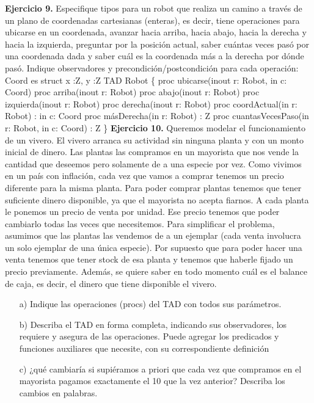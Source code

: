 \documentclass{article}
\begin{document}
\textbf{Ejercicio 9.} Especifique tipos para un robot que realiza un camino a trav\'es de un plano de coordenadas cartesianas (enteras),
es decir, tiene operaciones para ubicarse en un coordenada, avanzar hacia arriba, hacia abajo, hacia la derecha y hacia la
izquierda, preguntar por la posici\'on actual, saber cu\'antas veces pas\'o por una coordenada dada y saber cu\'al es la coordenada
m\'as a la derecha por d\'onde pas\'o. Indique observadores y precondici\'on/postcondici\'on para cada operaci\'on:
Coord es struct {x :Z, y :Z}
TAD Robot \{
proc ubicarse(inout r: Robot, in c: Coord)
proc arriba(inout r: Robot)
proc abajo(inout r: Robot)
proc izquierda(inout r: Robot)
proc derecha(inout r: Robot)
proc coordActual(in r: Robot) : in c: Coord
proc m\'asDerecha(in r: Robot) : Z
proc cuantasVecesPaso(in r: Robot, in c: Coord) : Z
\}
\textbf{Ejercicio 10.} Queremos modelar el funcionamiento de un vivero. El vivero arranca su actividad sin ninguna planta y con
un monto inicial de dinero.
Las plantas las compramos en un mayorista que nos vende la cantidad que deseemos pero solamente de a una especie
por vez. Como vivimos en un pa\'is con inflaci\'on, cada vez que vamos a comprar tenemos un precio diferente para la misma
planta. Para poder comprar plantas tenemos que tener suficiente dinero disponible, ya que el mayorista no acepta fiarnos.
A cada planta le ponemos un precio de venta por unidad. Ese precio tenemos que poder cambiarlo todas las veces que
necesitemos. Para simplificar el problema, asumimos que las plantas las vendemos de a un ejemplar (cada venta involucra
un solo ejemplar de una \'unica especie). Por supuesto que para poder hacer una venta tenemos que tener stock de esa planta
y tenemos que haberle fijado un precio previamente. Adem\'as, se quiere saber en todo momento cu\'al es el balance de caja,
es decir, el dinero que tiene disponible el vivero.
\begin{itemize}
    \item[a)] Indique las operaciones (procs) del TAD con todos sus par\'ametros.
    \item[b)] Describa el TAD en forma completa, indicando sus observadores, los requiere y asegura de las operaciones. Puede agregar
    los predicados y funciones auxiliares que necesite, con su correspondiente definici\'on
    \item[c)] ¿qu\'e cambiar\'ia si supi\'eramos a priori que cada vez que compramos en el mayorista pagamos exactamente el 10 %
    que la vez anterior? Describa los cambios en palabras.
\end{itemize}
\end{document}
